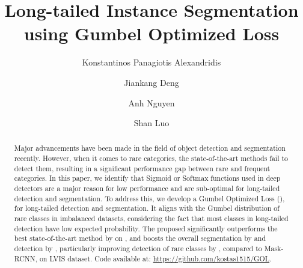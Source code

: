 \documentclass[runningheads]{llncs}
\begin{document}
\pagestyle{headings}
\mainmatter
\def\ECCVSubNumber{6148}  

\title{Long-tailed Instance Segmentation using
Gumbel Optimized Loss} 

\begin{comment}
\titlerunning{ECCV-22 submission ID \ECCVSubNumber} 
\authorrunning{ECCV-22 submission ID \ECCVSubNumber} 
\author{Anonymous ECCV submission}
\institute{Paper ID \ECCVSubNumber}
\end{comment}


\author{Konstantinos Panagiotis Alexandridis\Envelope \and
Jiankang Deng \and
Anh Nguyen \and
Shan Luo
}


\maketitle

\begin{abstract}
Major advancements have been made in the field of object detection and segmentation recently. However, when it comes to rare categories, the state-of-the-art methods fail to detect them, resulting in a significant performance gap between rare and frequent categories. In this paper, we identify that Sigmoid or Softmax functions used in deep detectors are a major reason for low performance and are sub-optimal for long-tailed  detection and segmentation. To address this, we develop a Gumbel Optimized Loss (), for long-tailed  detection and segmentation. It aligns with the Gumbel distribution of rare classes in imbalanced datasets, considering the fact that most classes in long-tailed detection have low expected probability. The proposed  significantly outperforms the best state-of-the-art method by  on , and boosts the overall segmentation by  and detection by , particularly improving detection of rare classes by , compared to Mask-RCNN, on LVIS dataset. Code available at: \url{https://github.com/kostas1515/GOL}.
\end{abstract}
\end{document}
